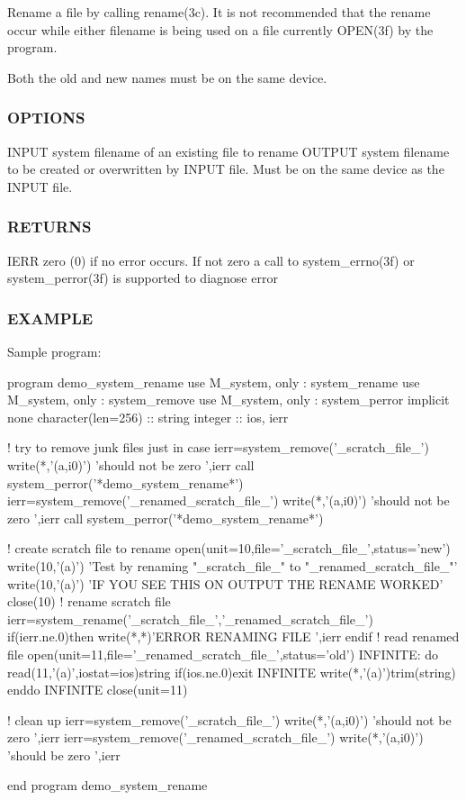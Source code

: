 Rename a file by calling rename(3c). It is not recommended that the rename occur while either filename is being used on a file currently O\+P\+E\+N(3f) by the program.

Both the old and new names must be on the same device. \subsubsection*{O\+P\+T\+I\+O\+NS}

I\+N\+P\+UT system filename of an existing file to rename O\+U\+T\+P\+UT system filename to be created or overwritten by I\+N\+P\+UT file. Must be on the same device as the I\+N\+P\+UT file. \subsubsection*{R\+E\+T\+U\+R\+NS}

I\+E\+RR zero (0) if no error occurs. If not zero a call to system\+\_\+errno(3f) or system\+\_\+perror(3f) is supported to diagnose error \subsubsection*{E\+X\+A\+M\+P\+LE}

\begin{DoxyVerb}Sample program:

  program demo_system_rename
  use M_system, only : system_rename
  use M_system, only : system_remove
  use M_system, only : system_perror
  implicit none
  character(len=256) :: string
  integer            :: ios, ierr

  ! try to remove junk files just in case
  ierr=system_remove('_scratch_file_')
  write(*,'(a,i0)') 'should not be zero ',ierr
  call system_perror('*demo_system_rename*')
  ierr=system_remove('_renamed_scratch_file_')
  write(*,'(a,i0)') 'should not be zero ',ierr
  call system_perror('*demo_system_rename*')

  ! create scratch file to rename
  open(unit=10,file='_scratch_file_',status='new')
  write(10,'(a)') 'Test by renaming "_scratch_file_" to "_renamed_scratch_file_"'
  write(10,'(a)') 'IF YOU SEE THIS ON OUTPUT THE RENAME WORKED'
  close(10)
  ! rename scratch file
  ierr=system_rename('_scratch_file_','_renamed_scratch_file_')
  if(ierr.ne.0)then
     write(*,*)'ERROR RENAMING FILE ',ierr
  endif
  ! read renamed file
  open(unit=11,file='_renamed_scratch_file_',status='old')
  INFINITE: do
     read(11,'(a)',iostat=ios)string
     if(ios.ne.0)exit INFINITE
     write(*,'(a)')trim(string)
  enddo INFINITE
  close(unit=11)

  ! clean up
  ierr=system_remove('_scratch_file_')
  write(*,'(a,i0)') 'should not be zero ',ierr
  ierr=system_remove('_renamed_scratch_file_')
  write(*,'(a,i0)') 'should be zero ',ierr

  end program demo_system_rename
\end{DoxyVerb}


